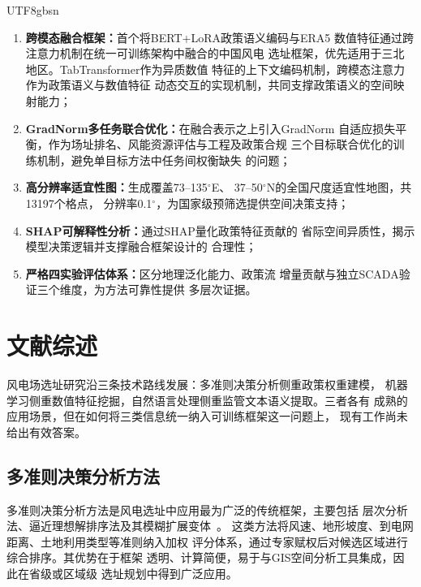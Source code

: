 \documentclass[12pt, a4paper]{article}
\begin{document}
\begin{CJK}{UTF8}{gbsn}
\begin{enumerate}[leftmargin=2em]
  \item \textbf{跨模态融合框架：}首个将BERT+LoRA政策语义编码与ERA5
        数值特征通过跨注意力机制在统一可训练架构中融合的中国风电
        选址框架，优先适用于三北地区。TabTransformer作为异质数值
        特征的上下文编码机制，跨模态注意力作为政策语义与数值特征
        动态交互的实现机制，共同支撑政策语义的空间映射能力；
  \item \textbf{GradNorm多任务联合优化：}在融合表示之上引入GradNorm
        自适应损失平衡，作为场址排名、风能资源评估与工程及政策合规
        三个目标联合优化的训练机制，避免单目标方法中任务间权衡缺失
        的问题；
  \item \textbf{高分辨率适宜性图：}生成覆盖73--135$^\circ$E、
        37--50$^\circ$N的全国尺度适宜性地图，共13197个格点，
        分辨率0.1$^\circ$，为国家级预筛选提供空间决策支持；
  \item \textbf{SHAP可解释性分析：}通过SHAP量化政策特征贡献的
        省际空间异质性，揭示模型决策逻辑并支撑融合框架设计的
        合理性；
  \item \textbf{严格四实验评估体系：}区分地理泛化能力、政策流
        增量贡献与独立SCADA验证三个维度，为方法可靠性提供
        多层次证据。
\end{enumerate}

\section{文献综述}

风电场选址研究沿三条技术路线发展：多准则决策分析侧重政策权重建模，
机器学习侧重数值特征挖掘，自然语言处理侧重监管文本语义提取。三者各有
成熟的应用场景，但在如何将三类信息统一纳入可训练框架这一问题上，
现有工作尚未给出有效答案。

\subsection{多准则决策分析方法}

多准则决策分析方法是风电选址中应用最为广泛的传统框架，主要包括
层次分析法、逼近理想解排序法及其模糊扩展变体~\cite{xu2020,wu2022}。
这类方法将风速、地形坡度、到电网距离、土地利用类型等准则纳入加权
评分体系，通过专家赋权后对候选区域进行综合排序。其优势在于框架
透明、计算简便，易于与GIS空间分析工具集成，因此在省级或区域级
选址规划中得到广泛应用。


\end{CJK}
\end{document}
